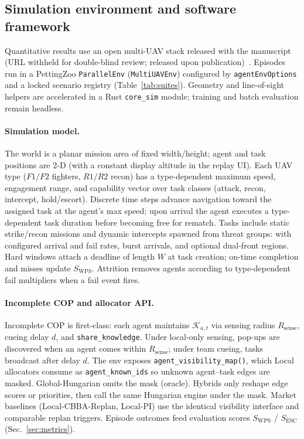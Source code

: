 \documentclass[journal,twocolumn,10pt]{IEEEtran}
\begin{document}
\subsection{Simulation environment and software framework}
\label{sec:env}
Quantitative results use an open multi-UAV stack released with the manuscript
(URL withheld for double-blind review; released upon publication)~\cite{multi_uav_ta_gym}.
Episodes run in a PettingZoo \texttt{ParallelEnv} (\texttt{MultiUAVEnv}) configured by \texttt{agentEnvOptions} and a locked scenario registry (Table~\ref{tab:suites}).
Geometry and line-of-sight helpers are accelerated in a Rust \texttt{core\_sim} module; training and batch evaluation remain headless.

\paragraph{Simulation model.}
The world is a planar mission area of fixed width/height; agent and task positions are 2-D (with a constant display altitude in the replay UI).
Each UAV type (\(F1/F2\) fighters, \(R1/R2\) recon) has a type-dependent maximum speed, engagement range, and capability vector over task classes (attack, recon, intercept, hold/escort).
Discrete time steps advance navigation toward the assigned task at the agent's max speed; upon arrival the agent executes a type-dependent task duration before becoming free for rematch.
Tasks include static strike/recon missions and dynamic intercepts spawned from threat groups: with configured arrival and fail rates, burst arrivals, and optional dual-front regions.
Hard windows attach a deadline of length \(W\) at task creation; on-time completion and misses update \(S_{\mathrm{WPS}}\).
Attrition removes agents according to type-dependent fail multipliers when a fail event fires.

\paragraph{Incomplete COP and allocator API.}
Incomplete COP is first-class: each agent maintains \(\mathcal{K}_{a,t}\) via sensing radius \(R_{\mathrm{sense}}\), cueing delay \(d\), and \texttt{share\_knowledge}.
Under local-only sensing, pop-ups are discovered when an agent comes within \(R_{\mathrm{sense}}\); under team cueing, tasks broadcast after delay \(d\).
The env exposes \texttt{agent\_visibility\_map()}, which Local allocators consume as \texttt{agent\_known\_ids} so unknown agent--task edges are masked.
Global-Hungarian omits the mask (oracle).
Hybrids only reshape edge scores or priorities, then call the same Hungarian engine under the mask.
Market baselines (Local-CBBA-Replan, Local-PI) use the identical visibility interface and comparable replan triggers.
Episode outcomes feed evaluation scores \(S_{\mathrm{WPS}}\) / \(S_{\mathrm{ESC}}\) (Sec.~\ref{sec:metrics}).
\end{document}
